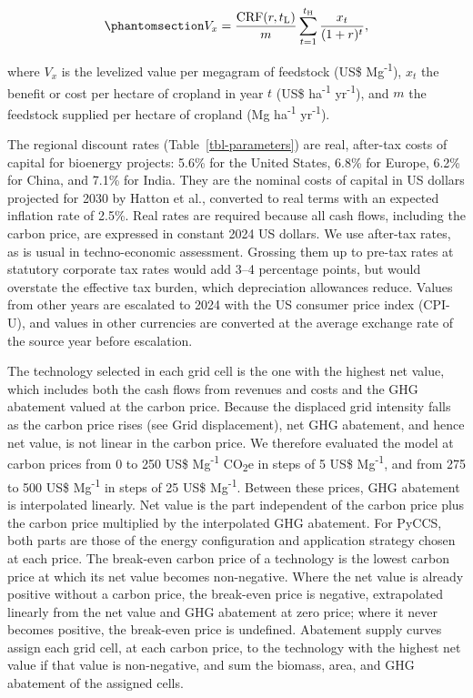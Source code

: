 \documentclass[
  letterpaper,
  twoside,
  twocolumn,
  9pt]{article}
\begin{document}
\begin{equation}\phantomsection\label{eq-ag-level}{V_x = \frac{\mathrm{CRF}(r, t_{\mathrm{L}})}{m} \sum_{t=1}^{t_{\mathrm{H}}} \frac{x_t}{(1+r)^t},}\end{equation}

where \(V_x\) is the levelized value per megagram of feedstock (US\$
Mg\textsuperscript{-1}), \(x_t\) the benefit or cost per hectare of
cropland in year \(t\) (US\$ ha\textsuperscript{-1}
yr\textsuperscript{-1}), and \(m\) the feedstock supplied per hectare of
cropland (Mg ha\textsuperscript{-1} yr\textsuperscript{-1}).

The regional discount rates (Table~\ref{tbl-parameters}) are real,
after-tax costs of capital for bioenergy projects: 5.6\% for the United
States, 6.8\% for Europe, 6.2\% for China, and 7.1\% for India. They are
the nominal costs of capital in US dollars projected for 2030 by Hatton
et al.\citep{hatton2025}, converted to real terms with an expected
inflation rate of 2.5\%. Real rates are required because all cash flows,
including the carbon price, are expressed in constant 2024 US dollars.
We use after-tax rates, as is usual in techno-economic assessment.
Grossing them up to pre-tax rates at statutory corporate tax rates
\citep{enache2024} would add 3--4 percentage points, but would overstate
the effective tax burden, which depreciation allowances reduce. Values
from other years are escalated to 2024 with the US consumer price index
(CPI-U), and values in other currencies are converted at the average
exchange rate of the source year before escalation.

The technology selected in each grid cell is the one with the highest
net value, which includes both the cash flows from revenues and costs
and the GHG abatement valued at the carbon price. Because the displaced
grid intensity falls as the carbon price rises (see Grid displacement),
net GHG abatement, and hence net value, is not linear in the carbon
price. We therefore evaluated the model at carbon prices from 0 to 250
US\$ Mg\textsuperscript{-1} CO\textsubscript{2}e in steps of 5 US\$
Mg\textsuperscript{-1}, and from 275 to 500 US\$ Mg\textsuperscript{-1}
in steps of 25 US\$ Mg\textsuperscript{-1}. Between these prices, GHG
abatement is interpolated linearly. Net value is the part independent of
the carbon price plus the carbon price multiplied by the interpolated
GHG abatement. For PyCCS, both parts are those of the energy
configuration and application strategy chosen at each price. The
break-even carbon price of a technology is the lowest carbon price at
which its net value becomes non-negative. Where the net value is already
positive without a carbon price, the break-even price is negative,
extrapolated linearly from the net value and GHG abatement at zero
price; where it never becomes positive, the break-even price is
undefined. Abatement supply curves assign each grid cell, at each carbon
price, to the technology with the highest net value if that value is
non-negative, and sum the biomass, area, and GHG abatement of the
assigned cells.
\end{document}
